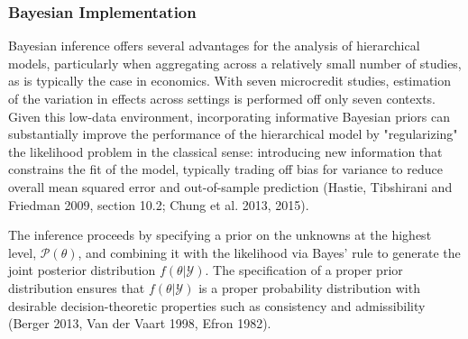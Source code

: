\documentclass[AER]{AEA}
\begin{document}


\subsubsection{Bayesian Implementation}

Bayesian inference offers several advantages for the analysis of hierarchical models, particularly when aggregating across a relatively small number of studies, as is typically the case in economics. With seven microcredit studies, estimation of the variation in effects across settings is performed off only seven contexts. Given this low-data environment, incorporating informative Bayesian priors can substantially improve the performance of the hierarchical model by "regularizing" the likelihood problem in the classical sense: introducing new information that constrains the fit of the model, typically trading off bias for variance to reduce overall mean squared error and out-of-sample prediction (Hastie, Tibshirani and Friedman 2009, section 10.2; Chung et al. 2013, 2015). 

The inference proceeds by specifying a prior on the unknowns at the highest level, $\mathcal{P}(\theta)$, and combining it with the likelihood via Bayes' rule to generate the joint posterior distribution $f(\theta | \mathcal{Y}) $. The specification of a proper prior distribution ensures that $f(\theta | \mathcal{Y}) $ is a proper probability distribution with desirable decision-theoretic properties such as consistency and admissibility (Berger 2013, Van der Vaart 1998, Efron 1982). 
\end{document}
